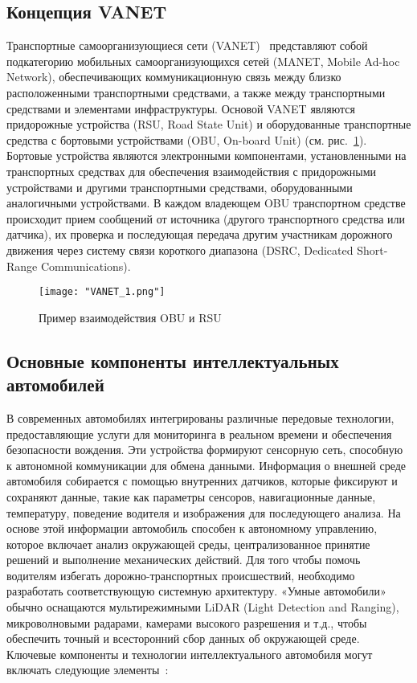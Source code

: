 \subsection{Концепция VANET}

Транспортные самоорганизующиеся сети (VANET)~\cite{anwer2014survey} представляют собой подкатегорию мобильных самоорганизующихся сетей (MANET, Mobile Ad-hoc Network), обеспечивающих коммуникационную связь между близко расположенными транспортными средствами, а также между транспортными средствами и элементами инфраструктуры. Основой VANET являются придорожные устройства (RSU, Road State Unit) и оборудованные транспортные средства с бортовыми устройствами (OBU, On-board Unit) (см. рис.~\ref{fig:vanet}). Бортовые устройства являются электронными компонентами, установленными на транспортных средствах для обеспечения взаимодействия с придорожными устройствами и другими транспортными средствами, оборудованными аналогичными устройствами. В каждом владеющем OBU транспортном средстве происходит прием сообщений от источника (другого транспортного средства или датчика), их проверка и последующая передача другим участникам дорожного движения через систему связи короткого диапазона (DSRC, Dedicated Short-Range Communications).

\begin{figure}[!h]
    \centering
    \texttt{[image: "VANET\_1.png"]}
    \caption{Пример взаимодействия OBU и RSU}
    \label{fig:vanet}
\end{figure}

\subsection{Основные компоненты интеллектуальных автомобилей}

В современных автомобилях интегрированы различные передовые технологии, предоставляющие услуги для мониторинга в реальном времени и обеспечения безопасности вождения. Эти устройства формируют сенсорную сеть, способную к автономной коммуникации для обмена данными.
Информация о внешней среде автомобиля собирается с помощью внутренних датчиков, которые фиксируют и сохраняют данные, такие как параметры сенсоров, навигационные данные, температуру, поведение водителя и изображения для последующего анализа. На основе этой информации автомобиль способен к автономному управлению, которое включает анализ окружающей среды, централизованное принятие решений и выполнение механических действий. Для того чтобы помочь водителям избегать дорожно-транспортных происшествий, необходимо разработать соответствующую системную архитектуру. «Умные автомобили» обычно оснащаются мультирежимными LiDAR (Light Detection and Ranging), микроволновыми радарами, камерами высокого разрешения и т.д., чтобы обеспечить точный и всесторонний сбор данных об окружающей среде. Ключевые компоненты и технологии интеллектуального автомобиля могут включать следующие элементы~\cite{raza2019survey}:

